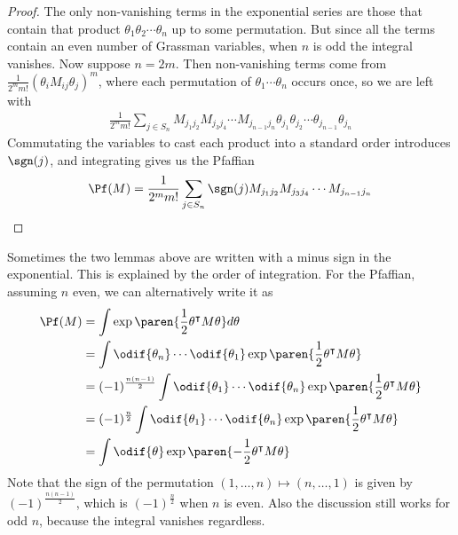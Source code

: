 \begin{proof}
	The only non-vanishing terms in the exponential series are those that
	contain that product $\theta_1\theta_2\cdots\theta_n$ up to some
	permutation. But since all the terms contain an even number of Grassman
	variables, when  $n$ is odd the integral vanishes. Now suppose  $n=2m$.
	Then non-vanishing terms come from
	$\frac{1}{2^mm!}(\theta_iM_{ij}\theta_j)^m$, where each permutation of
	$\theta_1\cdots\theta_n$ occurs once, so we are left with
	\begin{align*}
		\frac{1}{2^mm!}\sum_{j\in S_n} M_{j_1j_2}M_{j_3j_4}\cdots M_{j_{n-1}j_n}
		\theta_{j_1}\theta_{j_2}\cdots \theta_{j_{n-1}}\theta_{j_n}
	\end{align*}
	Commutating the variables to cast each product into a standard order
	introduces $\sgn(j)$, and integrating gives us the Pfaffian
	\[
	\Pf(M) = \frac{1}{2^{m}m!} \sum_{j\in S_n} \sgn(j)
	M_{j_1j_2}M_{j_3j_4}\cdots M_{j_{n-1}j_n}
	\] 
\end{proof}
\begin{remark}
	Sometimes the two lemmas above are written with a minus sign in the
	exponential. This is explained by the order of integration. For the
	Pfaffian, assuming $n$ even, we can alternatively write it as 
	\begin{align*}
		\Pf(M)
		&= \int \exp\paren{\frac{1}{2}\theta^{\intercal}M\theta} d\theta \\
		&= \int \odif{\theta_n}\cdots \odif{\theta_1} 
		\exp\paren{\frac{1}{2}\theta^{\intercal}M\theta} \\
		&= (-1)^{\frac{n(n-1)}{2}}\int \odif{\theta_1}\cdots \odif{\theta_n} 
		\exp\paren{\frac{1}{2}\theta^{\intercal}M\theta} \\
		&= (-1)^{\frac{n}{2}}\int \odif{\theta_1}\cdots \odif{\theta_n} 
		\exp\paren{\frac{1}{2}\theta^{\intercal}M\theta} \\
		&= \int \odif{\theta} 
		\exp\paren{-\frac{1}{2}\theta^{\intercal}M\theta} 
	\end{align*}
	Note that the sign of the permutation $(1,\ldots,n)\mapsto(n,\ldots,1)$ is
	given by $(-1)^{\frac{n(n-1)}{2}}$, which is $(-1)^{\frac{n}{2}}$ when $n$ is even.
	Also the discussion still works for odd $n$, because the integral vanishes
	regardless.
\end{remark}
